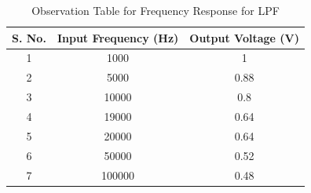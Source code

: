 \documentclass[a4paper,12pt]{article}
\begin{document}
\begin{table}[H]
    \centering
    \renewcommand{\arraystretch}{1.3} %
    \begin{tabular}{|c|c|c|}
        \hline
        \textbf{S. No.} & \textbf{Input Frequency (Hz)} &\textbf{Output Voltage (V)} \\
        \hline
        1 & 1000 & 1  \\
        2 & 5000 & 0.88  \\
        3 & 10000 & 0.8  \\
        4 & 19000 & 0.64  \\
        5 & 20000 & 0.64  \\
        6 & 50000 & 0.52  \\
        7 & 100000 & 0.48  \\
        \hline
    \end{tabular}
    \caption{Observation Table for Frequency Response for LPF}
    \label{tab:observation}
\end{table}
\begin{figure}[H]
    \centering
    \hfill
\end{figure}
\begin{figure}[H]
    \centering
    \hfill
\end{figure}
\end{document}

